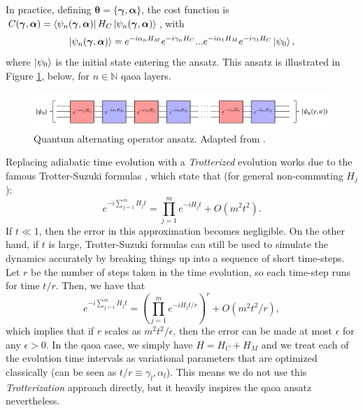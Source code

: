 In practice, defining $\boldsymbol{\theta} = \{\boldsymbol{\gamma}, \boldsymbol{\alpha}\}$, the cost function is $C(\boldsymbol{\gamma}, \boldsymbol{\alpha}) = \bra{\psi_n(\boldsymbol{\gamma}, \boldsymbol{\alpha})}H_C\ket{\psi_n(\boldsymbol{\gamma}, \boldsymbol{\alpha})}$, with
\begin{equation}\label{eq:Psi_p}
    \ket{\psi_n(\boldsymbol{\gamma}, \boldsymbol{\alpha})} = e^{-i\alpha_nH_M}e^{-i\gamma_nH_C} ... e^{-i\alpha_1H_M}e^{-i\gamma_1H_C}\ket{\psi_0},
\end{equation}
where $\ket{\psi_0}$ is the initial state entering the ansatz. This ansatz is illustrated in Figure \ref{fig:QAOA_Trotterization}, below, for $n \in \mathbb{N}$ \acrshort{qaoa} layers.
\begin{figure}[H]
    \centering
    \includegraphics[width = \linewidth]{Figures/Diagrams/QAOA_Trotterization.png}
    \caption{Quantum alternating operator ansatz. Adapted from \cite{Intro_QAOA}.}
    \label{fig:QAOA_Trotterization}
\end{figure}
\noindent Replacing adiabatic time evolution with a \textit{Trotterized} evolution works due to the famous Trotter-Suzuki formulas \cite{nielsen2010quantum}, which state that (for general non-commuting $H_j$):
\begin{equation}
    e^{-i\sum_{j=1}^{m}H_{j}t}=\prod_{j=1}^{m}e^{-i H_{j}t}+O(m^{2}t^{2}).
\end{equation}
If $t \ll 1$, then the error in this approximation becomes negligible. On the other hand, if $t$ is large, Trotter-Suzuki formulas can still be used to simulate the dynamics accurately by breaking things up into a sequence of short time-steps. Let $r$ be the number of steps taken in the time evolution, so each time-step runs for time $t/r$. Then, we have that
\begin{equation}
    e^{-i\sum_{j=1}^{m}H_{j}t}=\left(\prod_{j=1}^{m}e^{-i H_{j}t/r}\right)^{r}+O(m^{2}t^{2}/r),
\end{equation}
which implies that if $r$ scales as $m^2t^2/\epsilon$, then the error can be made at most $\epsilon$ for any $\epsilon > 0$. In the \acrshort{qaoa} case, we simply have $H = H_C + H_M$ and we treat each of the evolution time intervals as variational parameters that are optimized classically (can be seen as $t/r \equiv \gamma_l, \alpha_l$). This means we do not use this \textit{Trotterization} approach directly, but it heavily inspires the \acrshort{qaoa} ansatz nevertheless. 

